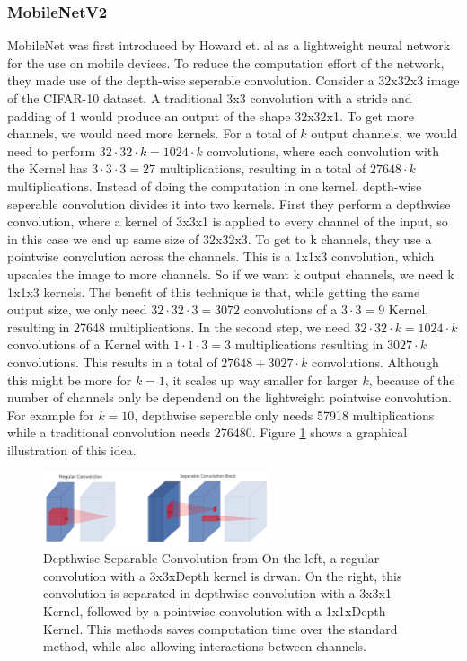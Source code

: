\subsubsection{MobileNetV2}
MobileNet was first introduced by Howard et. al \cite{howard2017mobilenets} as a
lightweight neural network for the use on mobile devices. To reduce the
computation effort of the network, they made use of the depth-wise seperable
convolution. Consider a 32x32x3 image of the CIFAR-10 dataset. A traditional 3x3
convolution with a stride and padding of 1 would produce an output of the shape
32x32x1. To get more channels, we would need more kernels. For a total of $k$
output channels, we would need to perform $32\cdot 32 \cdot k=1024\cdot k$
convolutions, where each convolution with the Kernel has $3\cdot 3 \cdot 3=27$
multiplications, resulting in a total of $27648\cdot k$ multiplications.
Instead of doing the computation in one kernel, depth-wise seperable convolution
divides it into two kernels. First they perform a depthwise convolution, where a
kernel of 3x3x1 is applied to every channel of the input, so in this case we end
up same size of 32x32x3. To get to k channels, they use a pointwise convolution
across the channels. This is a 1x1x3 convolution, which upscales the image to
more channels. So if we want k output channels, we need k 1x1x3 kernels. The
benefit of this technique is that, while getting the same output size, we only
need $32\cdot 32 \cdot 3=3072$ convolutions of a $3\cdot 3=9$ Kernel, resulting
in 27648 multiplications. In the second step, we need $32\cdot 32\cdot
k=1024\cdot k$ convolutions of a Kernel with $1\cdot 1\cdot 3=3$ multiplications
resulting in $3027\cdot k$ convolutions. This results in a total of $27648 +
3027\cdot k$ convolutions. Although this might be more for $k=1$, it scales up
way smaller for larger $k$, because of the number of channels only be dependend
on the lightweight pointwise convolution. For example for $k=10$, depthwise
seperable only needs 57918 multiplications while a traditional convolution needs
276480. Figure \ref{fig:DSConv} shows a graphical illustration of this idea.
\begin{figure}[h!]\label{fig:DSConv}
    \centering
    \includegraphics[width=0.6\textwidth]{images/Depthwise_Separable_Convolution.png}
    \caption{Depthwise Separable Convolution from \cite[Page 3]{sandler2018mobilenetv2} \newline On the left,
     a regular convolution with a 3x3xDepth kernel is drwan. On the right, this
     convolution is separated in depthwise convolution with a 3x3x1 Kernel,
     followed by a pointwise convolution with a 1x1xDepth Kernel. This methods
     saves computation time over the standard method, while also allowing
     interactions between channels.}
\end{figure}


